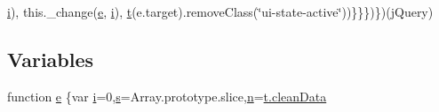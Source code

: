 \begin{DoxyCompactItemize}
\hyperlink{static_2root_2js_2jquery-ui_8custom_8min_8js_aba29173262d28394924f99eb2ed5b31b}{i}), this.\-\_\-change(\hyperlink{static_2root_2js_2jquery-ui_8custom_8min_8js_abea95a4e94bc6f4151d5683d4c12c3f4}{e}, \hyperlink{static_2root_2js_2jquery-ui_8custom_8min_8js_aba29173262d28394924f99eb2ed5b31b}{i}), \hyperlink{static_2root_2js_2bootstrap_2jquery-ui-1_810_84_8custom_8min_8js_acf335ef347969ef6dc8387e680fb289e}{t}(e.\-target).remove\-Class(\char`\"{}ui-\/state-\/active\char`\"{}))\}\}\})\})(j\-Query)
\end{DoxyCompactItemize}
\subsection*{Variables}
\begin{DoxyCompactItemize}
\item 
function \hyperlink{root_2static_2root_2js_2bootstrap_2jquery-ui-1_810_84_8custom_8min_8js_a2c038346d47955cbe2cb91e338edd7e1}{e} \{var \hyperlink{static_2root_2js_2jquery-ui_8custom_8min_8js_aba29173262d28394924f99eb2ed5b31b}{i}=0,\hyperlink{static_2root_2js_2jquery-ui_8custom_8min_8js_a387623556fbc0ba947c5babd49e10aaa}{s}=Array.\-prototype.\-slice,\hyperlink{static_2root_2js_2intro_8min_8js_afc984c4f6c68ce30a0af99006f5f8d27}{n}=\hyperlink{static_2root_2js_2jquery-ui_8custom_8min_8js_a69cf3a5538f71f728a82d0faf3b132c7}{t.\-clean\-Data}
\item 

\end{DoxyCompactItemize}
